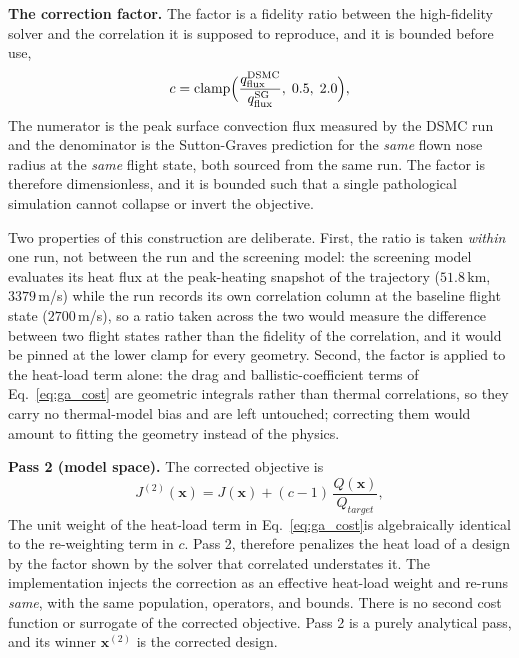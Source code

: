 \textbf{The correction factor.} The factor is a fidelity ratio between the high-fidelity solver and the correlation it is supposed to reproduce, and it is bounded before use,
\begin{equation}
    c = \operatorname{clamp}\Bigl(\frac{q^{\mathrm{DSMC}}_{\mathrm{flux}}}{q^{\mathrm{SG}}_{\mathrm{flux}}},\;\allowbreak 0.5,\;\allowbreak 2.0\Bigr),
    \label{eq:correction_factor}
\end{equation}
The numerator is the peak surface convection flux measured by the DSMC run and the denominator is the Sutton-Graves prediction for the \emph{same} flown nose radius at the \emph{same} flight state, both sourced from the same run. The factor is therefore dimensionless, and it is bounded such that a single pathological simulation cannot collapse or invert the objective.

Two properties of this construction are deliberate. First, the ratio is taken \emph{within} one run, not between the run and the screening model: the screening model evaluates its heat flux at the peak-heating snapshot of the trajectory ($51.8$\,km, $3379$\,m/s) while the run records its own correlation column at the baseline flight state ($2700$\,m/s), so a ratio taken across the two would measure the difference between two flight states rather than the fidelity of the correlation, and it would be pinned at the lower clamp for every geometry. Second, the factor is applied to the heat-load term alone: the drag and ballistic-coefficient terms of Eq.~\eqref{eq:ga_cost} are geometric integrals rather than thermal correlations, so they carry no thermal-model bias and are left untouched; correcting them would amount to fitting the geometry instead of the physics.

\textbf{Pass 2 (model space).} The corrected objective is
\begin{equation}
    J^{(2)}(\mathbf{x}) = J(\mathbf{x}) + (c-1)\,\frac{Q(\mathbf{x})}{Q_{target}},
    \label{eq:corrected_cost}
\end{equation}
The unit weight of the heat-load term in Eq.~\eqref{eq:ga_cost}is algebraically identical to the re-weighting term in $c$. Pass 2, therefore penalizes the heat load of a design by the factor shown by the solver that correlated understates it. The implementation injects the correction as an effective heat-load weight and re-runs \emph{same}, with the same population, operators, and bounds. There is no second cost function or surrogate of the corrected objective. Pass 2 is a purely analytical pass, and its winner $\mathbf{x}^{(2)}$ is the corrected design.

